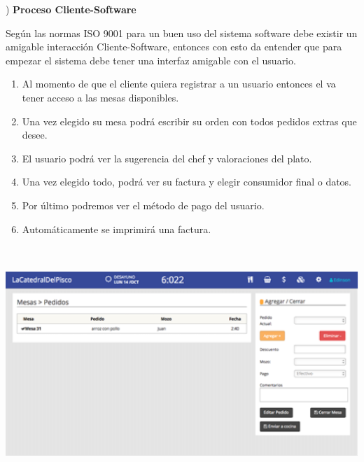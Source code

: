 \documentclass{article} %
\begin{document}
\noindent 

\noindent 

\noindent 

\noindent 

) \textbf{Proceso Cliente-Software}

\noindent Seg\'{u}n las normas ISO 9001 para un buen uso del sistema software debe existir un amigable interacci\'{o}n Cliente-Software, entonces con esto da entender que para empezar el sistema debe tener una interfaz amigable con el usuario.

\begin{enumerate}
\item  Al momento de que el cliente quiera registrar a un usuario entonces el va tener acceso a las mesas disponibles.

\item  Una vez elegido su mesa podr\'{a} escribir su orden con todos pedidos extras que desee.

\item  El usuario podr\'{a} ver la sugerencia del chef y valoraciones del plato.

\item  Una vez elegido todo, podr\'{a} ver su factura y elegir consumidor final o datos.

\item  Por \'{u}ltimo podremos ver el m\'{e}todo de pago del usuario.

\item  Autom\'{a}ticamente se imprimir\'{a} una factura.
\end{enumerate}

\noindent \includegraphics*[width=6.75in, height=3.52in, keepaspectratio=false]{image6}
\end{document}
